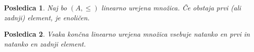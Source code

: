 \documentclass[a4paper, 10pt]{article}
\newtheorem{posl}{Posledica}
\begin{document}
	\begin{posl}
		Naj bo $(A, \leq)$ linearno urejena množica. Če obstaja prvi (ali zadnji) element, je enoličen.
	\end{posl}
	\begin{posl}
		Vsaka končna linearno urejena množica vsebuje natanko en prvi in natanko en zadnji element.
	\end{posl}
\end{document}
